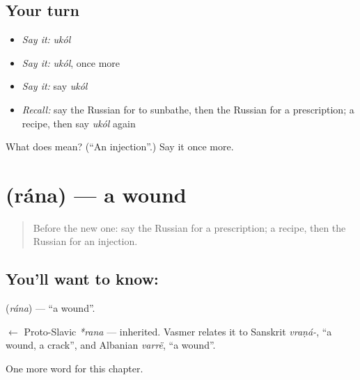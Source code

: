 \subsection*{Your turn}
\begin{itemize}
\raggedright
  \item \emph{Say it:} \emph{ukól}
  \item \emph{Say it:} \emph{ukól}, once more
  \item \emph{Say it:} say \emph{ukól}
  \item \emph{Recall:} say the Russian for to sunbathe, then the Russian for a prescription; a recipe, then say \emph{ukól} again
\end{itemize}

\begin{tcolorbox}[breakable,colback=teal!4,colframe=teal!35!black,title={Before you move on}]
What does  mean? (\textquotedblleft{}An injection\textquotedblright{}.) Say it once more.
\end{tcolorbox}
\section[\texorpdfstring{\ru{рана} (rána)}{рана (rána)}]{ (rána) — a wound}

\label{lesson:RU-C179-rana}



\begin{quote}
Before the new one: say the Russian for a prescription; a recipe, then the Russian for an injection.
\end{quote}

\subsection*{You'll want to know: }
\textbf{} (\emph{rána}) — \textquotedblleft{}a wound\textquotedblright{}.

\begin{cousinweb}
\textbf{} $\leftarrow$ Proto-Slavic \emph{*rana} — inherited. Vasmer relates it to Sanskrit \emph{vraṇá-}, \textquotedblleft{}a wound, a crack\textquotedblright{}, and Albanian \emph{varrë}, \textquotedblleft{}a wound\textquotedblright{}.
\end{cousinweb}

\begin{grammarlens}[title={What you've built}]
One more word for this chapter.
\end{grammarlens}

